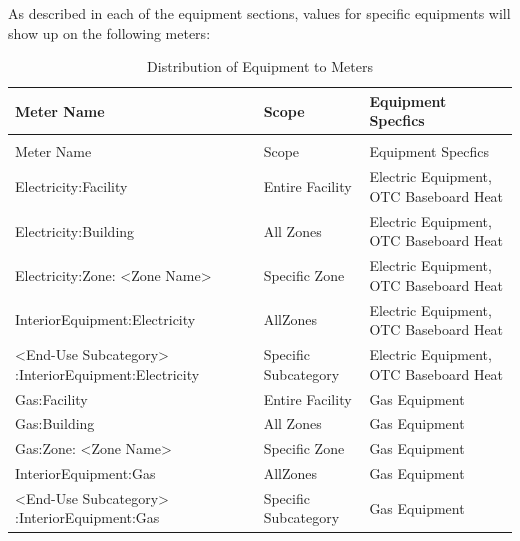 As described in each of the equipment sections, values for specific equipments will show up on the following meters:

\begin{longtable}[c]{>{\raggedright}p{2.8in}>{\raggedright}p{1.2in}>{\raggedright}p{2.0in}}
\caption{Distribution of Equipment to Meters \label{table:distribution-of-equipment-to-meters}} \tabularnewline
\toprule 
Meter Name & Scope & Equipment Specfics \tabularnewline
\midrule
\endfirsthead

\caption[]{Distribution of Equipment to Meters} \tabularnewline
\toprule 
Meter Name & Scope & Equipment Specfics \tabularnewline
\midrule
\endhead

Electricity:\-Facility & Entire Facility & Electric Equipment, OTC Baseboard Heat \tabularnewline
Electricity:\-Building & All Zones & Electric Equipment, OTC Baseboard Heat \tabularnewline
Electricity:\-Zone: <Zone Name> & Specific Zone & Electric Equipment, OTC Baseboard Heat \tabularnewline
Interior\-Equipment:\-Electricity & AllZones & Electric Equipment, OTC Baseboard Heat \tabularnewline
<End-Use Subcategory> :\-Interior\-Equipment:\-Electricity & Specific Subcategory & Electric Equipment, OTC Baseboard Heat \tabularnewline
Gas:\-Facility & Entire Facility & Gas Equipment \tabularnewline
Gas:\-Building & All Zones & Gas Equipment \tabularnewline
Gas:\-Zone: <Zone Name> & Specific Zone & Gas Equipment \tabularnewline
Interior\-Equipment:\-Gas & AllZones & Gas Equipment \tabularnewline
<End-Use Subcategory> :Interior\-Equipment:\-Gas & Specific Subcategory & Gas Equipment \tabularnewline
\bottomrule
\end{longtable}

